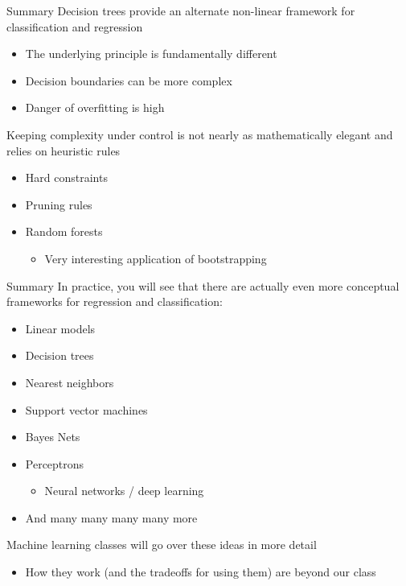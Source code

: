 \documentclass[aspectratio=169]{../latex_main/tntbeamer}  %
\begin{document}
	\begin{frame}{Summary}
	    Decision trees provide an alternate non-linear framework for classification and regression
	    \begin{itemize}
	        \item The underlying principle is fundamentally different
	        \item Decision boundaries can be more complex
	        \item Danger of overfitting is high
	    \end{itemize}
	    \bigskip
	    Keeping complexity under control is not nearly as mathematically elegant and relies on heuristic rules
	    \begin{itemize}
	        \item Hard constraints
	        \item Pruning rules
	        \item Random forests
	        \begin{itemize}
	            \item Very interesting application of bootstrapping
	        \end{itemize}
	    \end{itemize}
	\end{frame}
	
	\begin{frame}{Summary}
	   In practice, you will see that there are actually even more conceptual frameworks for regression and classification:
	    \begin{itemize}
	        \item Linear models
	        \item Decision trees
	        \item Nearest neighbors
	        \item Support vector machines
	        \item Bayes Nets
	        \item Perceptrons
	        \begin{itemize}
	            \item Neural networks / deep learning
	        \end{itemize}
	        \item And many many many many more
	    \end{itemize}
	    Machine learning classes will go over these ideas in more detail
	    \begin{itemize}
	        \item How they work (and the tradeoffs for using them) are beyond our class
	    \end{itemize}
	\end{frame}
\end{document}
